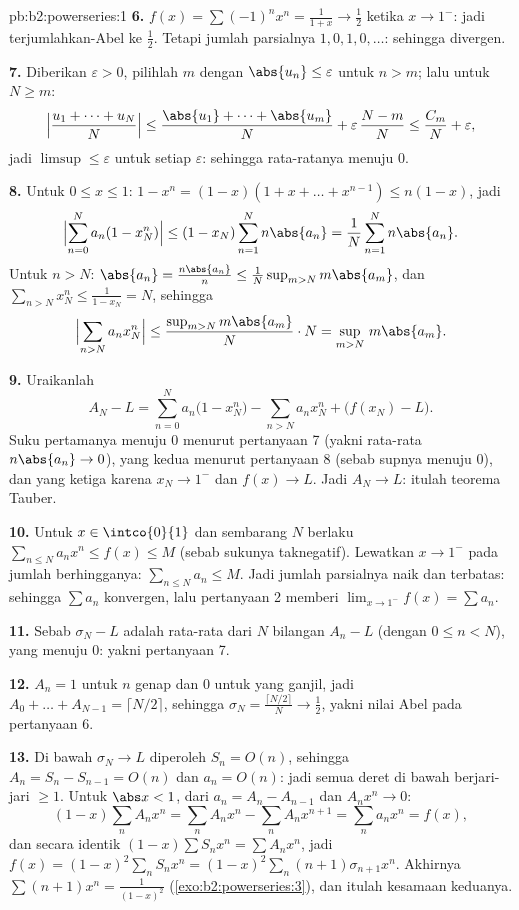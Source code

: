 \begin{solution}{pb:b2:powerseries:1}
\textbf{6.} $f(x) = \sum(-1)^nx^n = \frac{1}{1+x} \to \frac12$
ketika $x \to 1^-$: jadi terjumlahkan-Abel ke $\frac12$. Tetapi jumlah
parsialnya $1, 0, 1, 0, \dots$: sehingga divergen.

\textbf{7.} Diberikan $\varepsilon > 0$, pilihlah $m$ dengan $\abs{u_n}
\leq \varepsilon$ untuk $n > m$; lalu untuk $N \geq m$:
\[
\Bigl|\frac{u_1 + \dots + u_N}{N}\Bigr|
\leq \frac{\abs{u_1} + \dots + \abs{u_m}}{N} +
\varepsilon\,\frac{N - m}{N}
\leq \frac{C_m}{N} + \varepsilon,
\]
jadi $\limsup \leq \varepsilon$ untuk setiap $\varepsilon$: sehingga
rata-ratanya menuju $0$.

\textbf{8.} Untuk $0 \leq x \leq 1$: $1 - x^n = (1-x)(1 + x +
\dots + x^{n-1}) \leq n(1-x)$, jadi
\[
\Bigl|\sum_{n=0}^N a_n(1 - x_N^n)\Bigr|
\leq (1 - x_N)\sum_{n=1}^N n\abs{a_n}
= \frac1N\sum_{n=1}^{N}n\abs{a_n} .
\]
Untuk $n > N$: $\abs{a_n} = \frac{n\abs{a_n}}{n} \leq
\frac{1}{N}\sup_{m>N}m\abs{a_m}$, dan $\sum_{n>N}x_N^n \leq
\frac{1}{1 - x_N} = N$, sehingga
\[
\Bigl|\sum_{n>N}a_nx_N^n\Bigr|
\leq \frac{\sup_{m>N}m\abs{a_m}}{N}\cdot N
= \sup_{m>N}\,m\abs{a_m} .
\]

\textbf{9.} Uraikanlah
\[
A_N - L = \sum_{n=0}^{N}a_n\bigl(1 - x_N^n\bigr)
- \sum_{n>N}a_nx_N^n + \bigl(f(x_N) - L\bigr) .
\]
Suku pertamanya menuju $0$ menurut pertanyaan 7 (yakni rata-rata
$n\abs{a_n} \to 0$), yang kedua menurut pertanyaan 8 (sebab supnya menuju
$0$), dan yang ketiga karena $x_N \to 1^-$ dan $f(x) \to L$. Jadi
$A_N \to L$: itulah teorema Tauber.

\textbf{10.} Untuk $x \in \intco{0}{1}$ dan sembarang $N$ berlaku
$\sum_{n\leq N}a_nx^n \leq f(x) \leq M$ (sebab sukunya taknegatif).
Lewatkan $x \to 1^-$ pada jumlah berhingganya: $\sum_{n\leq N}a_n \leq M$.
Jadi jumlah parsialnya naik dan terbatas: sehingga $\sum a_n$
konvergen, lalu pertanyaan 2 memberi $\lim_{x\to1^-}f(x) =
\sum a_n$.

\textbf{11.} Sebab $\sigma_N - L$ adalah rata-rata dari $N$ bilangan
$A_n - L$ (dengan $0 \leq n < N$), yang menuju $0$: yakni pertanyaan 7.

\textbf{12.} $A_n = 1$ untuk $n$ genap dan $0$ untuk yang ganjil, jadi
$A_0 + \dots + A_{N-1} = \lceil N/2\rceil$, sehingga $\sigma_N =
\frac{\lceil N/2\rceil}{N} \to \frac12$, yakni nilai Abel pada
pertanyaan 6.

\textbf{13.} Di bawah $\sigma_N \to L$ diperoleh $S_n = O(n)$, sehingga
$A_n = S_n - S_{n-1} = O(n)$ dan $a_n = O(n)$: jadi semua deret
di bawah berjari-jari $\geq 1$. Untuk $\abs x < 1$, dari $a_n = A_n -
A_{n-1}$ dan $A_nx^n \to 0$:
\[
(1-x)\sum_n A_nx^n = \sum_n A_nx^n - \sum_n A_nx^{n+1}
= \sum_n a_nx^n = f(x),
\]
dan secara identik $(1-x)\sum S_nx^n = \sum A_nx^n$, jadi $f(x) =
(1-x)^2\sum_n S_nx^n = (1-x)^2\sum_n(n+1)\sigma_{n+1}x^n$.
Akhirnya $\sum(n+1)x^n = \frac{1}{(1-x)^2}$
(\cref{exo:b2:powerseries:3}), dan itulah kesamaan keduanya.


\end{solution}
